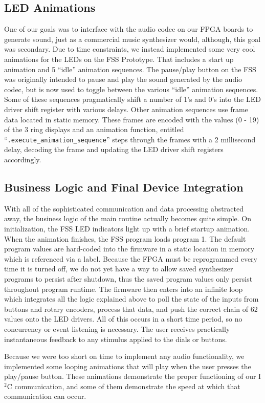 \documentclass[conference]{IEEEtran}
\begin{document}
\subsection{LED Animations}
One of our goals was to interface with the audio codec on our FPGA boards to generate sound, just as a commercial music synthesizer would, although, this goal was secondary. Due to time constraints, we instead implemented some very cool animations for the LEDs on the FSS Prototype. That includes a start up animation and 5 ``idle'' animation sequences. The pause/play button on the FSS was originally intended to pause and play the sound generated by the audio codec, but is now used to toggle between the various ``idle'' animation sequences. Some of these sequences pragmatically shift a number of 1's and 0's into the LED driver shift register with various delays. Other animation sequences use frame data located in static memory. These frames are encoded with the values (0 - 19) of the 3 ring displays and an animation function, entitled ``\verb|.execute_animation_sequence|'' steps through the frames with a 2 millisecond delay, decoding the frame and updating the LED driver shift registers accordingly.

\subsection{Business Logic and Final Device Integration}
With all of the sophisticated communication and data processing abstracted away, the business logic of the main routine actually becomes quite simple. On initialization, the FSS LED indicators light up with a brief startup animation. When the animation finishes, the FSS program loads program 1. The default program values are hard-coded into the firmware in a static location in memory which is referenced via a  label. Because the FPGA must be reprogrammed every time it is turned off, we do not yet have a way to allow saved synthesizer programs to persist after shutdown, thus the saved program values only persist throughout program runtime. The firmware then enters into an infinite loop which integrates all the logic explained above to poll the state of the inputs from buttons and rotary encoders, process that data, and push the correct chain of 62 values onto the LED drivers. All of this occurs in a short time period, so no concurrency or event listening is necessary. The user receives practically instantaneous feedback to any stimulus applied to the dials or buttons.

Because we were too short on time to implement any audio functionality, we implemented some looping animations that will play when the user presses the play/pause button. These animations demonstrate the proper functioning of our I$^2$C communication, and some of them demonstrate the speed at which that communication can occur.
\end{document}
